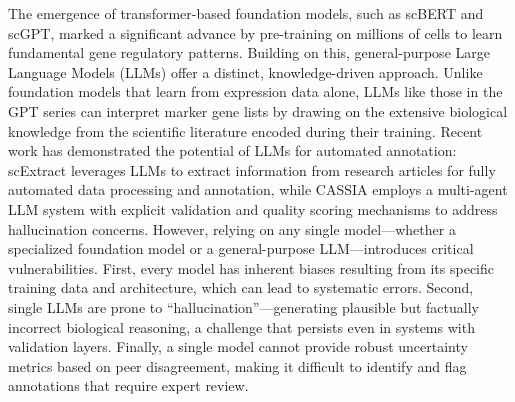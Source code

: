 \documentclass[pdflatex,sn-nature]{sn-jnl}%
\theoremstyle{thmstyleone}%
\theoremstyle{thmstyletwo}%
\theoremstyle{thmstylethree}%
\begin{document}
The emergence of transformer-based foundation models, such as scBERT\cite{yang2022scbert} and scGPT\cite{cui2024scgpt}, marked a significant advance by pre-training on millions of cells to learn fundamental gene regulatory patterns. Building on this, general-purpose Large Language Models (LLMs) offer a distinct, knowledge-driven approach. Unlike foundation models that learn from expression data alone, LLMs like those in the GPT series can interpret marker gene lists by drawing on the extensive biological knowledge from the scientific literature encoded during their training\cite{houAssessingGPT4Cell2024}. Recent work has demonstrated the potential of LLMs for automated annotation: scExtract leverages LLMs to extract information from research articles for fully automated data processing and annotation\cite{wu2025scextract}, while CASSIA employs a multi-agent LLM system with explicit validation and quality scoring mechanisms to address hallucination concerns\cite{xie2024cassia}. However, relying on any single model—whether a specialized foundation model or a general-purpose LLM—introduces critical vulnerabilities. First, every model has inherent biases resulting from its specific training data and architecture, which can lead to systematic errors. Second, single LLMs are prone to ``hallucination''—generating plausible but factually incorrect biological reasoning, a challenge that persists even in systems with validation layers\cite{xie2024cassia}. Finally, a single model cannot provide robust uncertainty metrics based on peer disagreement, making it difficult to identify and flag annotations that require expert review.
\end{document}
